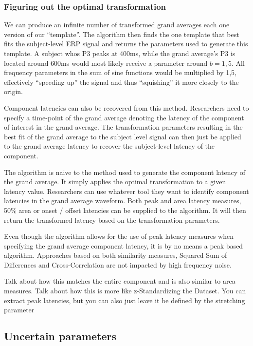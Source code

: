 \documentclass[
  man,floatsintext]{apa7}
\begin{document}
\hypertarget{figuring-out-the-optimal-transformation}{%
\subsubsection{Figuring out the optimal transformation}\label{figuring-out-the-optimal-transformation}}

We can produce an infinite number of transformed grand averages each one version of our ``template''. The algorithm then finds the one template that best fits the subject-level ERP signal and returns the parameters used to generate this template. A subject whos P3 peaks at 400ms, while the grand average's P3 is located around 600ms would most likely receive a parameter around \(b = 1,5\). All frequency parameters in the sum of sine functions would be multiplied by 1,5, effectively ``speeding up'' the signal and thus ``squishing'' it more closely to the origin.

Component latencies can also be recovered from this method. Researchers need to specify a time-point of the grand average denoting the latency of the component of interest in the grand average. The transformation parameters resulting in the best fit of the grand average to the subject level signal can then just be applied to the grand average latency to recover the subject-level latency of the component.

The algorithm is naive to the method used to generate the component latency of the grand average. It simply applies the optimal transformation to a given latency value. Researchers can use whatever tool they want to identify component latencies in the grand average waveform. Both peak and area latency measures, 50\% area or onset / offset latencies can be supplied to the algorithm. It will then return the transformed latency based on the transformation parameters.

Even though the algorithm allows for the use of peak latency measures when specifying the grand average component latency, it is by no means a peak based algorithm. Approaches based on both similarity measures, Squared Sum of Differences and Cross-Correlation are not impacted by high frequency noise.

Talk about how this matches the entire component and is also similar to area measures.
Talk about how this is more like z-Standardizing the Dataset. You can extract peak latencies, but you can also just leave it be defined by the stretching parameter

\hypertarget{uncertain-parameters}{%
\subsection{Uncertain parameters}\label{uncertain-parameters}}
\end{document}
